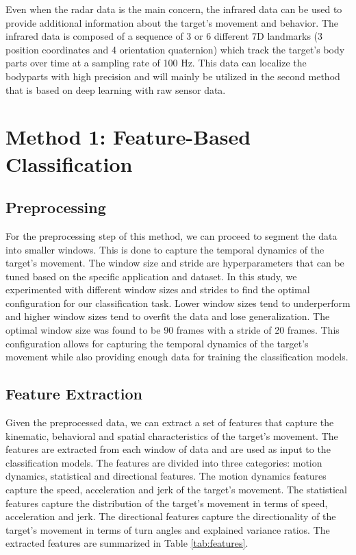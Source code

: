 \documentclass{article}
\begin{document}
Even when the radar data is the main concern, the infrared data can be used to provide additional information about the target's movement and behavior. The infrared data is composed of a sequence of 3 or 6 different 7D landmarks (3 position coordinates and 4 orientation quaternion) which track the target's body parts over time at a sampling rate of 100 Hz. This data can localize the bodyparts with high precision and will mainly be utilized in the second method that is based on deep learning with raw sensor data.

\section{Method 1: Feature-Based Classification}

\subsection{Preprocessing}

For the preprocessing step of this method, we can proceed to segment the data into smaller windows. This is done to capture the temporal dynamics of the target's movement. The window size and stride are hyperparameters that can be tuned based on the specific application and dataset. In this study, we experimented with different window sizes and strides to find the optimal configuration for our classification task. Lower window sizes tend to underperform and higher window sizes tend to overfit the data and lose generalization. The optimal window size was found to be 90 frames with a stride of 20 frames. This configuration allows for capturing the temporal dynamics of the target's movement while also providing enough data for training the classification models.

\subsection{Feature Extraction}

Given the preprocessed data, we can extract a set of features that capture the kinematic, behavioral and spatial characteristics of the target's movement. The features are extracted from each window of data and are used as input to the classification models. The features are divided into three categories: motion dynamics, statistical and directional features. The motion dynamics features capture the speed, acceleration and jerk of the target's movement. The statistical features capture the distribution of the target's movement in terms of speed, acceleration and jerk. The directional features capture the directionality of the target's movement in terms of turn angles and explained variance ratios. The extracted features are summarized in Table \ref{tab:features}.
\end{document}
